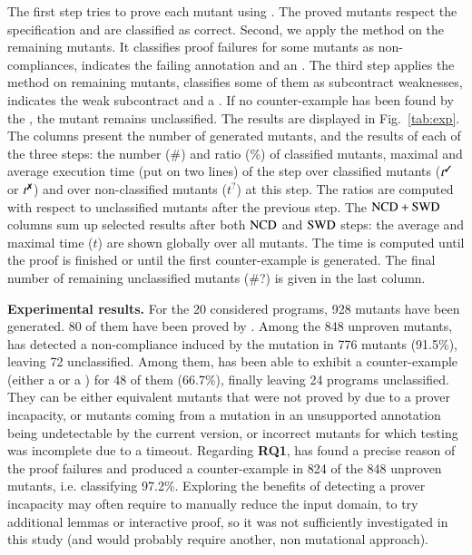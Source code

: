 The first step tries to prove each mutant using \Wp. 
The proved mutants respect the specification and are classified as correct. 
Second, we apply the \NCD method on the remaining mutants.
It classifies proof failures for some mutants as non-compliances, indicates the failing annotation and an \NCCE.
The third step applies the \CWD method on remaining mutants,
classifies some of them as subcontract weaknesses, indicates the weak subcontract and a \CWCE.
If no counter-example has been found by the \CWD, the mutant remains 
unclassified. %
The results are displayed in Fig.~\ref{tab:exp}.
The columns 
present the number of generated mutants, and the results of each of the three
steps: the number (\#) and ratio (\%) of classified mutants,
maximal and average execution time (put on two lines) of the step
over classified mutants ($t^\text{\ok}$ or $t^\text{\ko}$) and over non-classified
mutants ($t^\text{?}$) at this step.
The ratios are computed with respect to unclassified mutants after the previous step.
The $\mathrm{NCD}+\mathrm{SWD}$ columns sum up selected results after both $\mathrm{NCD}$ and $\mathrm{SWD}$ steps:
the average and maximal time ($t$) are shown globally over all mutants.
The time is computed until the proof is finished or until the first counter-example is generated.
The final number of remaining unclassified mutants (\#?) is given in the last column.


\textbf{Experimental results.}
For the 20 considered programs, 928 mutants have been generated. 80 of them 
have been proved by \Wp.
Among the 848 unproven mutants, \NCD has detected a non-compliance
induced by the mutation in 776 mutants (91.5\%),
leaving 72 unclassified.
Among them, \CWD has been able to exhibit a counter-example (either a \NCCE or a
\CWCE)
for 48 of them (66.7\%), finally leaving 24 programs unclassified.
They can be either equivalent mutants that were not proved
by \Wp due to a prover incapacity, or mutants coming from a mutation 
in an unsupported annotation being undetectable by the
current version, or incorrect mutants for which testing was incomplete due to a timeout.
Regarding \textbf{RQ1}, \stady has found a precise reason
of the proof failures  and produced a counter-example 
in 824 of the 848 unproven mutants, 
i.e. classifying 97.2\%.
Exploring the benefits of detecting a prover incapacity may often require to manually reduce
the input domain, to try additional lemmas or interactive proof, so it   
was not sufficiently investigated in this study 
(and would probably require another, non mutational approach).

